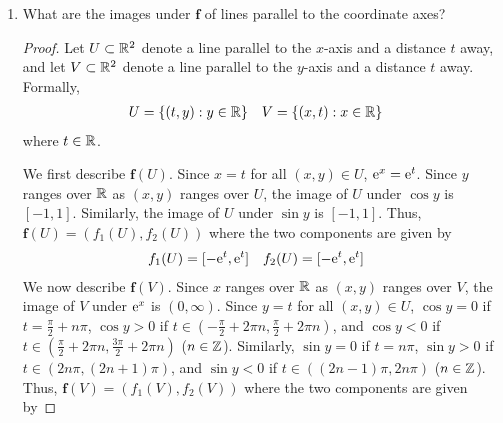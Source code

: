 \documentclass[../psets.tex]{subfiles}
\begin{document}
\begin{enumerate}[label={\textbf{\arabic*.}}]
\begin{enumerate}
\begin{proof}
\begin{align*}
\begin{bNiceMatrix}
                \end{bNiceMatrix}&
                    &=
                    \begin{bNiceMatrix}
                        \frac{1}{2} & \frac{\sqrt{3}}{2}\\
                        -\frac{\sqrt{3}}{2} & \frac{1}{2}
                    \end{bNiceMatrix}
            \end{align*}
            It follows from the definition of matrix multiplication that
            \begin{align*}
                \mathbf{g}'(\vec{b})\mathbf{f}'(\mathbf{g}(\vec{b})) &= \mathbf{g}'(\vec{b})\mathbf{f}'(\vec{a}) = I&
                \mathbf{f}'(\mathbf{g}(\vec{b}))\mathbf{g}'(\vec{b}) &= \mathbf{f}'(\vec{a})\mathbf{g}'(\vec{b}) = I
            \end{align*}
            as desired.
        \end{proof}
        \item What are the images under $\mathbf{f}$ of lines parallel to the coordinate axes?
        \begin{proof}
            Let $U\subset\R^2$ denote a line parallel to the $x$-axis and a distance $t$ away, and let $V\subset\R^2$ denote a line parallel to the $y$-axis and a distance $t$ away. Formally,
            \begin{align*}
                U &= \{(t,y):y\in\R\}&
                V &= \{(x,t):x\in\R\}
            \end{align*}
            where $t\in\R$.\par
            We first describe $\mathbf{f}(U)$. Since $x=t$ for all $(x,y)\in U$, $\e[x]=\e[t]$. Since $y$ ranges over $\R$ as $(x,y)$ ranges over $U$, the image of $U$ under $\cos y$ is $[-1,1]$. Similarly, the image of $U$ under $\sin y$ is $[-1,1]$. Thus, $\mathbf{f}(U)=(f_1(U),f_2(U))$ where the two components are given by
            \begin{align*}
                f_1(U) &= [-\e[t],\e[t]]&
                f_2(U) &= [-\e[t],\e[t]]
            \end{align*}
            We now describe $\mathbf{f}(V)$. Since $x$ ranges over $\R$ as $(x,y)$ ranges over $V$, the image of $V$ under $\e[x]$ is $(0,\infty)$. Since $y=t$ for all $(x,y)\in U$, $\cos y=0$ if $t=\frac{\pi}{2}+n\pi$, $\cos y>0$ if $t\in(-\frac{\pi}{2}+2\pi n,\frac{\pi}{2}+2\pi n)$, and $\cos y<0$ if $t\in(\frac{\pi}{2}+2\pi n,\frac{3\pi}{2}+2\pi n)$ ($n\in\Z$). Similarly, $\sin y=0$ if $t=n\pi$, $\sin y>0$ if $t\in(2n\pi,(2n+1)\pi)$, and $\sin y<0$ if $t\in((2n-1)\pi,2n\pi)$ ($n\in\Z$). Thus, $\mathbf{f}(V)=(f_1(V),f_2(V))$ where the two components are given by

\end{proof}
\end{enumerate}
\end{enumerate}
\end{document}
